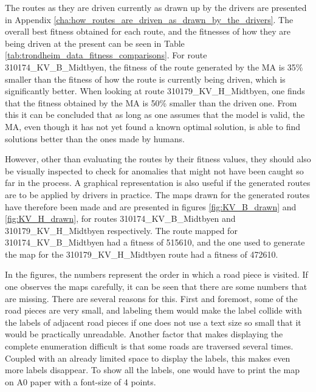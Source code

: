 The routes as they are driven currently as drawn up by the drivers are presented in Appendix \ref{cha:how_routes_are_driven_as_drawn_by_the_drivers}. The overall best fitness obtained for each route, and the fitnesses of how they are being driven at the present can be seen in Table \ref{tab:trondheim_data_fitness_comparisons}. For route 310174\_KV\_B\_Midtbyen, the fitness of the route generated by the MA is 35\% smaller than the fitness of how the route is currently being driven, which is significantly better. When looking at route 310179\_KV\_H\_Midtbyen, one finds that the fitness obtained by the MA is 50\% smaller than the driven one. From this it can be concluded that as long as one assumes that the model is valid, the MA, even though it has not yet found a known optimal solution, is able to find solutions better than the ones made by humans.


{
\begin{table}[tbph]
\centering
{} %
\caption{The best result obtained from the MA and the known optimal solution for the BHW1 benchmark.}
\label{tab:trondheim_data_fitness_comparisons}
\end{table}
}

However, other than evaluating the routes by their fitness values, they should also be visually inspected to check for anomalies that might not have been caught so far in the process. A graphical representation is also useful if the generated routes are to be applied by drivers in practice. The maps drawn for the generated routes have therefore been made and are presented in figures \ref{fig:KV_B_drawn} and \ref{fig:KV_H_drawn}, for routes 310174\_KV\_B\_Midtbyen and 310179\_KV\_H\_Midtbyen respectively. The route mapped for 310174\_KV\_B\_Midtbyen had a fitness of 515610, and the one used to generate the map for the 310179\_KV\_H\_Midtbyen route had a fitness of 472610.

In the figures, the numbers represent the order in which a road piece is visited. If one observes the maps carefully, it can be seen that there are some numbers that are missing. There are several reasons for this. First and foremost, some of the road pieces are very small, and labeling them would make the label collide with the labels of adjacent road pieces if one does not use a text size so small that it would be practically unreadable. Another factor that makes displaying the complete enumeration difficult is that some roads are traversed several times. Coupled with an already limited space to display the labels, this makes even more labels disappear. To show all the labels, one would have to print the map on A0 paper with a font-size of 4 points.

